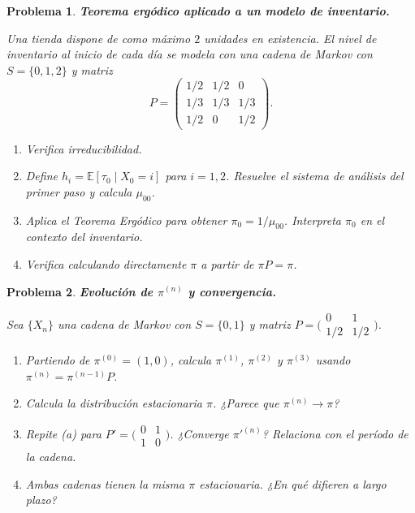 \documentclass[12pt]{article}
\newtheorem{problem}{Problema}
\begin{document}
\begin{problem}
\textbf{Teorema ergódico aplicado a un modelo de inventario.}

Una tienda dispone de como máximo $2$ unidades en existencia. El nivel de inventario al inicio de cada día se modela con una cadena de Markov con $S = \{0, 1, 2\}$ y matriz
\[
    P = \begin{pmatrix}
        1/2 & 1/2 & 0   \\
        1/3 & 1/3 & 1/3 \\
        1/2 & 0   & 1/2
    \end{pmatrix}.
\]
\begin{enumerate}
    \item[(a)] Verifica irreducibilidad.
    \item[(b)] Define $h_i = \mathbb{E}[\tau_0 \mid X_0 = i]$ para $i = 1, 2$. Resuelve el sistema de análisis del primer paso y calcula $\mu_{00}$.
    \item[(c)] Aplica el Teorema Ergódico para obtener $\pi_0 = 1/\mu_{00}$. Interpreta $\pi_0$ en el contexto del inventario.
    \item[(d)] Verifica calculando directamente $\pi$ a partir de $\pi P = \pi$.
\end{enumerate}
\end{problem}

\begin{problem}
\textbf{Evolución de $\pi^{(n)}$ y convergencia.}

Sea $\{X_n\}$ una cadena de Markov con $S = \{0, 1\}$ y matriz
$P = \bigl(\begin{smallmatrix} 0 & 1 \\ 1/2 & 1/2 \end{smallmatrix}\bigr)$.

\begin{enumerate}
    \item[(a)] Partiendo de $\pi^{(0)} = (1, 0)$, calcula $\pi^{(1)}$, $\pi^{(2)}$ y $\pi^{(3)}$ usando $\pi^{(n)} = \pi^{(n-1)} P$.
    \item[(b)] Calcula la distribución estacionaria $\pi$. ¿Parece que $\pi^{(n)} \to \pi$?
    \item[(c)] Repite (a) para $P' = \bigl(\begin{smallmatrix} 0 & 1 \\ 1 & 0 \end{smallmatrix}\bigr)$. ¿Converge $\pi'^{(n)}$? Relaciona con el período de la cadena.
    \item[(d)] Ambas cadenas tienen la misma $\pi$ estacionaria. ¿En qué difieren a largo plazo?
\end{enumerate}
\end{problem}
\end{document}

